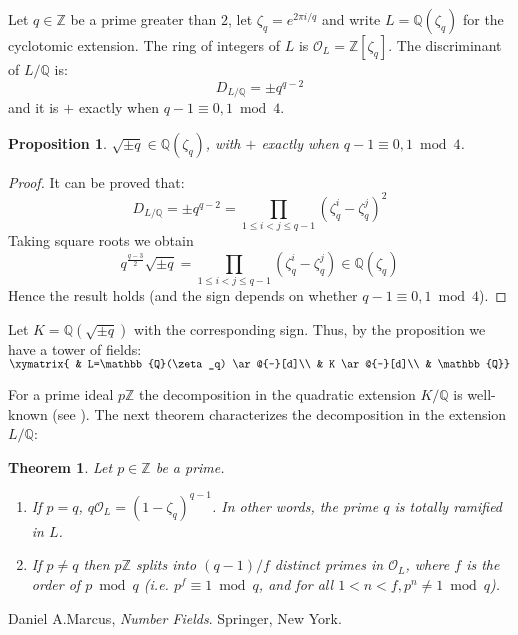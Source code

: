 \documentclass[12pt]{article}
\newtheorem{thm}{Theorem}
\newtheorem{prop}{Proposition}
\newcommand{\Ints}{\mathbb{Z}}
\newcommand{\Rats}{\mathbb{Q}}
\begin{document}
Let $q\in\Ints$ be a prime greater than $2$, let $\zeta_q=e^{2\pi
i/q}$ and write $L=\Rats(\zeta_q)$ for the cyclotomic extension.
The ring of integers of $L$ is $\mathcal{O}_L=\Ints[\zeta_q]$. The
discriminant of $L/\Rats$ is:
$$D_{L/\Rats}=\pm q^{q-2}$$
and it is $+$ exactly when $q-1\equiv 0,1\ \operatorname{mod}\ 4$.

\begin{prop}
$\sqrt{\pm q}\in \Rats(\zeta_q)$, with $+$ exactly when $q-1\equiv
0,1\ \operatorname{mod}\ 4$.
\end{prop}
\begin{proof}
It can be proved that:
$$D_{L/\Rats}=\pm q^{q-2}=\prod_{1\leq i < j \leq
q-1}(\zeta_q^i-\zeta_q^j)^2$$ Taking square roots we obtain
$$q^{\frac{q-3}{2}}\sqrt{\pm q}=\prod_{1\leq i < j \leq
q-1}(\zeta_q^i-\zeta_q^j)\in \Rats(\zeta_q)$$ Hence the result
holds (and the sign depends on whether $q-1\equiv 0,1\
\operatorname{mod}\ 4$).
\end{proof}

Let $K=\Rats(\sqrt{\pm q})$ with the corresponding sign. Thus, by
the proposition we have a tower of fields:
$\xymatrix{
 & L=\Rats(\zeta_q) \ar@{-}[d]\\
 & K \ar@{-}[d]\\
 & \Rats}$

For a prime ideal $p\Ints$ the decomposition in the quadratic
extension $K/\Rats$ is well-known (see ). The next theorem
characterizes the decomposition in the extension $L/\Rats$:

\begin{thm}
Let $p\in\Ints$ be a prime.
\begin{enumerate}
\item If $p=q$, $q\mathcal{O}_L=\left(1-\zeta_q\right)^{q-1}$. In
other words, the prime $q$ is totally ramified in $L$.

\item If $p\neq q$ then $p\Ints$ splits into $(q-1)/f$ distinct
primes in $\mathcal{O}_L$, where $f$ is the order of $p\
\operatorname{mod}\ q$ (i.e. $p^f\equiv 1\ \operatorname{mod}\ q$,
and for all $1< n<f, p^n\neq 1\ \operatorname{mod}\ q$).
\end{enumerate}
\end{thm}

\begin{thebibliography}{9}
 Daniel A.Marcus, {\em Number Fields}. Springer, New York.
\end{thebibliography}
\end{document}
